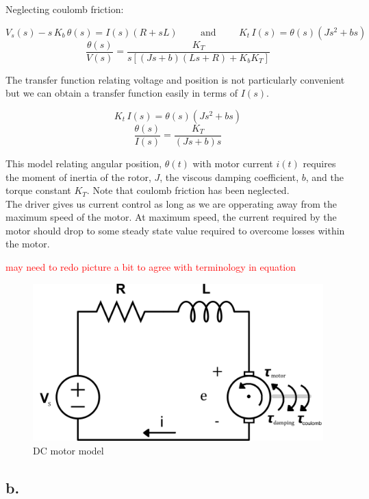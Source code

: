 \documentclass{article}
\newcommand{\xxx}[1]{\textcolor{red}{#1}}
\theoremstyle{plain}
\theoremstyle{definition}
\theoremstyle{remark}
\begin{document}
Neglecting coulomb friction:

$$ V_{s}(s) - s \, K_{b} \, \theta (s) = I(s) (R+sL) \hspace{1cm} \text{and} \hspace{1cm} K_{t} \, I(s) = \theta(s)(Js^2+bs) $$
$$ \frac{\theta(s)}{V(s)} = \frac{K_T}{s\left[ (Js + b)(Ls + R)+K_bK_T \right]} $$

The transfer function relating voltage and position is not particularly convenient but we can obtain a transfer function easily in terms of $I(s)$.

$$ K_{t} \, I(s) = \theta(s)(Js^2+bs) $$
$$ \frac{\theta(s)}{I(s)} = \frac{K_T}{(Js + b)s} $$

This model relating angular position, $\theta(t)$ with motor current $i(t)$ requires the moment of inertia of the rotor, $J$, the viscous damping coefficient, $b$, and the torque constant $K_T$.  Note that coulomb friction has been neglected. \\

The driver gives us current control as long as we are opperating away from the maximum speed of the motor.  At maximum speed, the current required by the motor should drop to some steady state value required to overcome losses within the motor.

\xxx{may need to redo picture a bit to agree with terminology in equation}
\begin{figure}[htb]
\begin{center}
\includegraphics[width = 13cm]{dcmotor.png}
\caption{DC motor model}
\label{q2_a1}
\end{center}
\end{figure}

\subsection*{b.}
\end{document}
